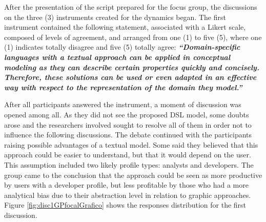 \documentclass[a4paper,twoside,anonymous]{article}
\begin{document}
After the presentation of the script prepared for the focus group, the discussions on the three (3) instruments created for the dynamics began.
The first instrument contained the following statement, associated with a Likert scale, composed of levels of agreement, and arranged from one (1) to five (5), where one (1) indicates totally disagree and five (5) totally agree:
\textit{\textbf{``Domain-specific languages with a textual approach can be applied in conceptual modeling as they can describe certain properties quickly and concisely.
Therefore, these solutions can be used or even adapted in an effective way with respect to the representation of the domain they model.''}}

After all participants answered the instrument, a moment of discussion was opened among all.
As they did not see the proposed DSL model, some doubts arose and the researchers involved sought to resolve all of them in order not to influence the following discussions.
The debate continued with the participants raising possible advantages of a textual model.
Some said they believed that this approach could be easier to understand, but that it would depend on the user.
This assumption included two likely profile types: analysts and developers.
The group came to the conclusion that the approach could be seen as more productive by users with a developer profile, but less profitable by those who had a more analytical bias due to their abstraction level in relation to graphic approaches.
Figure \ref{fig:disc1GPfocalGrafico} shows the responses distribution for the first discussion.
\end{document}
